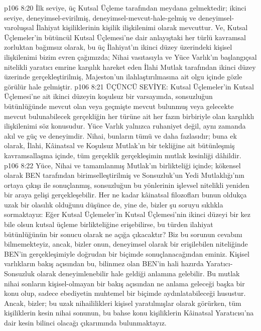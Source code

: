 \vs p106 8:20 İlk seviye, üç Kutsal Üçleme tarafından meydana gelmektedir; ikinci seviye, deneyimsel\hyp{}evirilmiş, deneyimsel\hyp{}mevcut\hyp{}hale\hyp{}gelmiş ve deneyimsel\hyp{}varoluşsal İlahiyat kişiliklerinin kişilik ilişkilenimi olarak mevcuttur. Ve, Kutsal Üçlemeler’in bütüncül Kutsal Üçlemesi’ne dair anlayıştaki her türlü kavramsal zorluktan bağımsız olarak, bu üç İlahiyat’ın ikinci düzey üzerindeki kişisel ilişkilenimi bizim evren çağımızda; Nihai vasıtasıyla ve Yüce Varlık’ın başlangıçsal nitelikli yaratıcı emrine karşılık hareket eden İlahi Mutlak tarafından ikinci düzey üzerinde gerçekleştirilmiş, Majeston’un ilahlaştırılmasına ait olgu içinde gözle görülür hale gelmiştir.
\vs p106 8:21 ÜÇÜNCÜ SEVİYE: Kutsal Üçlemeler’in Kutsal Üçlemesi’ne ait ikinci düzeyin koşulsuz bir varsayımda, sonsuzluğun bütünlüğünde mevcut olan veya geçmişte mevcut bulunmuş veya gelecekte mevcut bulunabilecek gerçekliğin her türüne ait her fazın birbiriyle olan karşılıklı ilişkilenimi söz konusudur. Yüce Varlık yalnızca ruhaniyet değil, aynı zamanda akıl ve güç ve deneyimdir. Nihai, bunların tümü ve daha fazlasıdır; buna ek olarak, İlahi, Kâinatsal ve Koşulsuz Mutlak’ın bir tekliğine ait bütünleşmiş kavramsallaşma içinde, tüm gerçeklik gerçekleşimin mutlak kesinliği dâhildir.
\vs p106 8:22 Yüce, Nihai ve tamamlanmış Mutlak’ın birlikteliği içinde; kökensel olarak BEN tarafından birimselleştirilmiş ve Sonsuzluk’un Yedi Mutlaklığı’nın ortaya çıkışı ile sonuçlanmış, sonsuzluğun bu yönlerinin işlevsel nitelikli yeniden bir araya gelişi gerçekleşebilir. Her ne kadar kâinatsal filozofları bunun oldukça uzak bir olasılık olduğunu düşünce de, yine de, bizler şu soruyu sıklıkla sormaktayız: Eğer Kutsal Üçlemeler’in Kutsal Üçlemesi’nin ikinci düzeyi bir kez bile olsun kutsal üçleme birlikteliğine erişebilirse, bu türden ilahiyat bütünlüğünün bir sonucu olarak ne açığa çıkacaktır? Biz bu sorunun cevabını bilmemekteyiz, ancak, bizler onun, deneyimsel olarak bir erişilebilen niteliğinde BEN’in gerçekleşimiyle doğrudan bir biçimde sonuçlanacağından eminiz. Kişisel varlıkların bakış açısından bu, bilinmez olan BEN’in hali hazırda Yaratıcı\hyp{}Sonsuzluk olarak deneyimlenebilir hale geldiği anlamına gelebilir. Bu mutlak nihai sonların kişisel\hyp{}olmayan bir bakış açısından ne anlama geleceği başka bir konu olup, sadece ebediyetin muhtemel bir biçimde aydınlatabileceği husustur. Ancak, bizler; bu uzak nihaililikleri kişisel yaratılmışlar olarak görürken, tüm kişiliklerin kesin nihai sonunun, bu bahse konu kişiliklerin Kâinatsal Yaratıcısı’na dair kesin bilinci olacağı çıkarımında bulunmaktayız.
